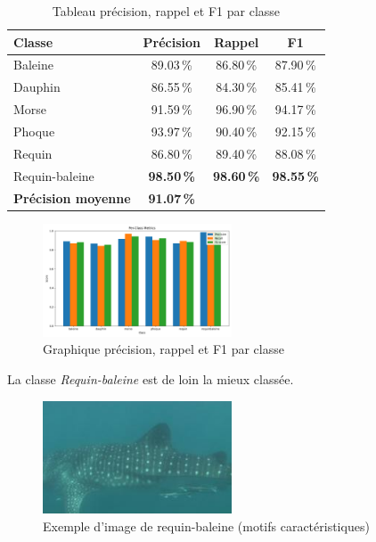 \documentclass{article}
\begin{document}
\begin{table}[H]
\centering
\begin{tabular}{lccc}
\toprule
\textbf{Classe}        & \textbf{Précision} & \textbf{Rappel} & \textbf{F1}     \\
\midrule
Baleine                & 89.03\,\%          & 86.80\,\%       & 87.90\,\%       \\
Dauphin                & 86.55\,\%          & 84.30\,\%       & 85.41\,\%       \\
Morse                  & 91.59\,\%          & 96.90\,\%       & 94.17\,\%       \\
Phoque                 & 93.97\,\%          & 90.40\,\%       & 92.15\,\%       \\
Requin                 & 86.80\,\%          & 89.40\,\%       & 88.08\,\%       \\
Requin-baleine         & \textbf{98.50\,\%} & \textbf{98.60\,\%} & \textbf{98.55\,\%} \\
\midrule
\textbf{Précision moyenne} & \textbf{91.07\,\%} &                 &                 \\
\bottomrule
\end{tabular}
\caption{Tableau précision, rappel et F1 par classe}
\end{table}

\begin{figure}[H]
    \centering
    \includegraphics[width=0.5\textwidth]{assets/class_metrics.png}
    \caption{Graphique précision, rappel et F1 par classe}
\end{figure}

La classe \emph{Requin-baleine} est de loin la mieux classée.

\begin{figure}[H]
    \centering
    \includegraphics[width=0.5\textwidth]{assets/4002.jpg}
    \caption{Exemple d'image de requin-baleine (motifs caractéristiques)}
\end{figure}
\end{document}
